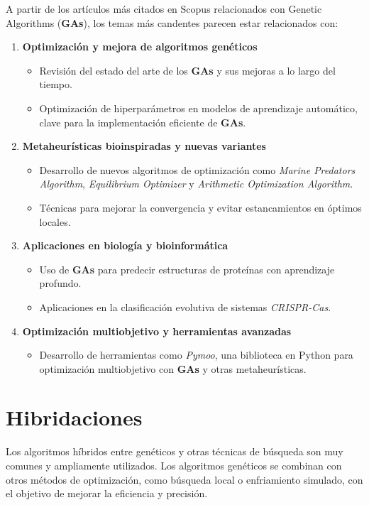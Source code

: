\documentclass[12pt,letterpaper]{article}
\begin{document}
A partir de los artículos más citados en Scopus relacionados con Genetic Algorithms (\textbf{GAs}), los temas más candentes parecen estar relacionados con:
\begin{enumerate}
    \item \textbf{Optimización y mejora de algoritmos genéticos}
    \begin{itemize}
        \item Revisión del estado del arte de los \textbf{GAs} y sus mejoras a lo largo del tiempo.
        \item Optimización de hiperparámetros en modelos de aprendizaje automático, clave para la implementación eficiente de \textbf{GAs}.
    \end{itemize}

    \item \textbf{Metaheurísticas bioinspiradas y nuevas variantes}
    \begin{itemize}
        \item Desarrollo de nuevos algoritmos de optimización como \textit{Marine Predators Algorithm}, \textit{Equilibrium Optimizer} y \textit{Arithmetic Optimization Algorithm}.
        \item Técnicas para mejorar la convergencia y evitar estancamientos en óptimos locales.
    \end{itemize}

    \item \textbf{Aplicaciones en biología y bioinformática}
    \begin{itemize}
        \item Uso de \textbf{GAs} para predecir estructuras de proteínas con aprendizaje profundo.
        \item Aplicaciones en la clasificación evolutiva de sistemas \textit{CRISPR-Cas}.
    \end{itemize}

    \item \textbf{Optimización multiobjetivo y herramientas avanzadas}
    \begin{itemize}
        \item Desarrollo de herramientas como \textit{Pymoo}, una biblioteca en Python para optimización multiobjetivo con \textbf{GAs} y otras metaheurísticas.
    \end{itemize}
\end{enumerate}

\section{Hibridaciones}
Los algoritmos híbridos entre genéticos y otras técnicas de búsqueda son muy comunes y ampliamente utilizados. Los algoritmos genéticos se combinan con otros métodos de optimización, como búsqueda local o enfriamiento simulado, con el objetivo de mejorar la eficiencia y precisión.
\end{document}
